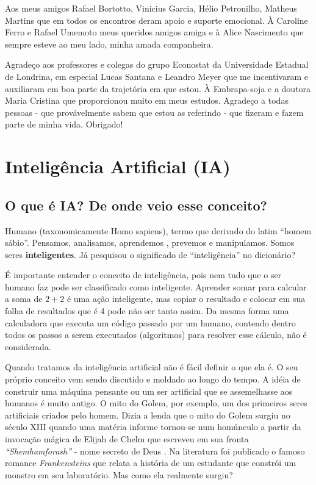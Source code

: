 \documentclass[
  openany]{book}
\begin{document}
Aos meus amigos Rafael Bortotto, Vinicius Garcia, Hélio Petronilho, Matheus Martins que em todos os encontros deram apoio e suporte emocional. À Caroline Ferro e Rafael Umemoto meus queridos amigos amiga e à Alice Nascimento que sempre esteve ao meu lado, minha amada companheira.

Agradeço aos professores e colegas do grupo Econostat da Universidade Estadual de Londrina, em especial Lucas Santana e Leandro Meyer que me incentivaram e auxiliaram em boa parte da trajetória em que estou. À Embrapa-soja e a doutora Maria Cristina que proporcionou muito em meus estudos. Agradeço a todas pessoas - que provávelmente sabem que estou as referindo - que fizeram e fazem parte de minha vida. Obrigado!

\hypertarget{i-a}{%
\chapter{Inteligência Artificial (IA)}\label{i-a}}

\hypertarget{o-que-uxe9-ia-de-onde-veio-esse-conceito}{%
\section{O que é IA? De onde veio esse conceito?}\label{o-que-uxe9-ia-de-onde-veio-esse-conceito}}

Humano (taxonomicamente Homo sapiens), termo que derivado do latim ``homem sábio''. Pensamos, analisamos, aprendemos , prevemos e manipulamos. Somos seres \textbf{inteligentes}. Já pesquisou o significado de ``inteligência'' no dicionário?

É importante entender o conceito de inteligência, pois nem tudo que o ser humano faz pode ser classificado como inteligente. Aprender somar para calcular a soma de \(2+2\) é uma ação inteligente, mas copiar o resultado e colocar em sua folha de resultados que é 4 pode não ser tanto assim. Da mesma forma uma calculadora que executa um código passado por um humano, contendo dentro todos os passos a serem executados (algoritmos) para resolver esse cálculo, não é considerada.

Quando tratamos da inteligência artificial não é fácil definir o que ela é. O seu próprio conceito vem sendo discutido e moldado ao longo do tempo. A idéia de construir uma máquina pensante ou um ser artificial que se assemelhasse aos humanos é muito antigo. O mito do Golem, por exemplo, um dos primeiros seres artificiais criados pelo homem. Dizia a lenda que o mito do Golem surgiu no século XIII quando uma matéria informe tornou-se num homúnculo a partir da invocação mágica de Elijah de Chelm que escreveu em sua fronta \emph{``Shemhamforash''} - nome secreto de Deus \citep{moser2006golem}. Na literatura foi publicado o famoso romance \emph{Frankensteins} \citep{shelley1818frankenstein} que relata a história de um estudante que constrói um monstro em seu laboratório. Mas como ela realmente surgiu?
\end{document}
